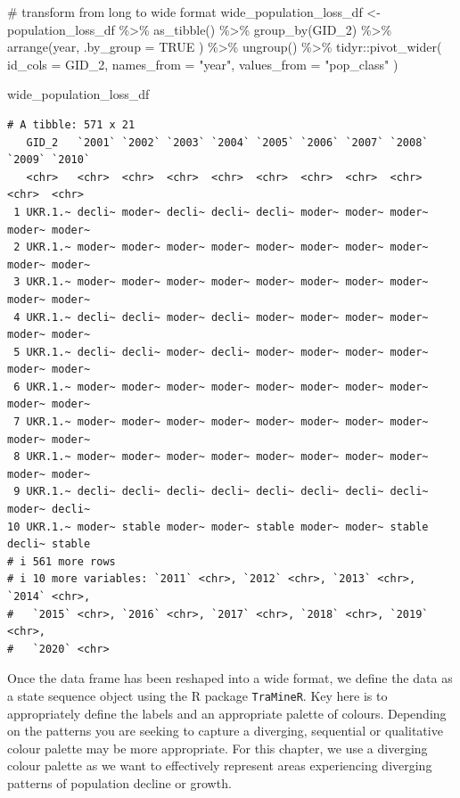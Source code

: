 \documentclass[
  letterpaper,
  DIV=11,
  numbers=noendperiod]{scrreprt}
\newenvironment{Shaded}{\begin{snugshade}}{\end{snugshade}}
\newcommand{\AttributeTok}[1]{\textcolor[rgb]{0.40,0.45,0.13}{#1}}
\newcommand{\CommentTok}[1]{\textcolor[rgb]{0.37,0.37,0.37}{#1}}
\newcommand{\ConstantTok}[1]{\textcolor[rgb]{0.56,0.35,0.01}{#1}}
\newcommand{\FunctionTok}[1]{\textcolor[rgb]{0.28,0.35,0.67}{#1}}
\newcommand{\NormalTok}[1]{\textcolor[rgb]{0.00,0.23,0.31}{#1}}
\newcommand{\OtherTok}[1]{\textcolor[rgb]{0.00,0.23,0.31}{#1}}
\newcommand{\SpecialCharTok}[1]{\textcolor[rgb]{0.37,0.37,0.37}{#1}}
\newcommand{\StringTok}[1]{\textcolor[rgb]{0.13,0.47,0.30}{#1}}
\begin{document}
\begin{Shaded}
\begin{Highlighting}[]
\CommentTok{\# transform from long to wide format}
\NormalTok{wide\_population\_loss\_df }\OtherTok{\textless{}{-}}\NormalTok{ population\_loss\_df }\SpecialCharTok{\%\textgreater{}\%} 
  \FunctionTok{as\_tibble}\NormalTok{() }\SpecialCharTok{\%\textgreater{}\%} 
  \FunctionTok{group\_by}\NormalTok{(GID\_2) }\SpecialCharTok{\%\textgreater{}\%} 
  \FunctionTok{arrange}\NormalTok{(year, }\AttributeTok{.by\_group =} \ConstantTok{TRUE}\NormalTok{ ) }\SpecialCharTok{\%\textgreater{}\%}
  \FunctionTok{ungroup}\NormalTok{() }\SpecialCharTok{\%\textgreater{}\%} 
\NormalTok{  tidyr}\SpecialCharTok{::}\FunctionTok{pivot\_wider}\NormalTok{(}
  \AttributeTok{id\_cols =}\NormalTok{  GID\_2,}
  \AttributeTok{names\_from =} \StringTok{"year"}\NormalTok{,}
  \AttributeTok{values\_from =} \StringTok{"pop\_class"}
\NormalTok{)}
  
\NormalTok{wide\_population\_loss\_df}
\end{Highlighting}
\end{Shaded}

\begin{verbatim}
# A tibble: 571 x 21
   GID_2   `2001` `2002` `2003` `2004` `2005` `2006` `2007` `2008` `2009` `2010`
   <chr>   <chr>  <chr>  <chr>  <chr>  <chr>  <chr>  <chr>  <chr>  <chr>  <chr> 
 1 UKR.1.~ decli~ moder~ decli~ decli~ decli~ moder~ moder~ moder~ moder~ moder~
 2 UKR.1.~ moder~ moder~ moder~ moder~ moder~ moder~ moder~ moder~ moder~ moder~
 3 UKR.1.~ moder~ moder~ moder~ moder~ moder~ moder~ moder~ moder~ moder~ moder~
 4 UKR.1.~ decli~ decli~ moder~ decli~ moder~ moder~ moder~ moder~ moder~ moder~
 5 UKR.1.~ decli~ decli~ moder~ decli~ moder~ moder~ moder~ moder~ moder~ moder~
 6 UKR.1.~ moder~ moder~ moder~ moder~ moder~ moder~ moder~ moder~ moder~ moder~
 7 UKR.1.~ moder~ moder~ moder~ moder~ moder~ moder~ moder~ moder~ moder~ moder~
 8 UKR.1.~ moder~ moder~ moder~ moder~ moder~ moder~ moder~ moder~ moder~ moder~
 9 UKR.1.~ decli~ decli~ decli~ decli~ decli~ decli~ decli~ decli~ moder~ decli~
10 UKR.1.~ moder~ stable moder~ moder~ stable moder~ moder~ stable decli~ stable
# i 561 more rows
# i 10 more variables: `2011` <chr>, `2012` <chr>, `2013` <chr>, `2014` <chr>,
#   `2015` <chr>, `2016` <chr>, `2017` <chr>, `2018` <chr>, `2019` <chr>,
#   `2020` <chr>
\end{verbatim}

Once the data frame has been reshaped into a wide format, we define the
data as a state sequence object using the R package \texttt{TraMineR}.
Key here is to appropriately define the labels and an appropriate
palette of colours. Depending on the patterns you are seeking to capture
a diverging, sequential or qualitative colour palette may be more
appropriate. For this chapter, we use a diverging colour palette as we
want to effectively represent areas experiencing diverging patterns of
population decline or growth.
\end{document}
